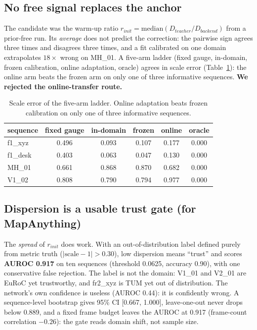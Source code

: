 \subsection{No free signal replaces the anchor}

The candidate was the warm-up ratio
$r_{init}=\mathrm{median}(D_{teacher}/D_{backend})$ from a prior-free run. Its
\emph{average} does not predict the correction: the pairwise sign agrees three
times and disagrees three times, and a fit calibrated on one domain extrapolates
$18\times$ wrong on MH\_01. A five-arm ladder (fixed gauge, in-domain, frozen
calibration, online adaptation, oracle) agrees in scale error
(Table~\ref{tab:ladder}): the online arm beats the frozen arm on only one of
three informative sequences. \textbf{We rejected the online-transfer route.}

\begin{table}[t]
\centering
\caption{Scale error of the five-arm ladder. Online adaptation beats frozen
calibration on only one of three informative sequences.}
\label{tab:ladder}
\small
\begin{tabular}{@{}lccccc@{}}
\toprule
sequence & fixed gauge & in-domain & frozen & online & oracle \\
\midrule
f1\_xyz & 0.496 & 0.093 & 0.107 & 0.177 & 0.000 \\
f1\_desk & 0.403 & 0.063 & 0.047 & 0.130 & 0.000 \\
MH\_01 & 0.661 & 0.868 & 0.870 & 0.682 & 0.000 \\
V1\_02 & 0.808 & 0.790 & 0.794 & 0.977 & 0.000 \\
\bottomrule
\end{tabular}
\end{table}

\subsection{Dispersion is a usable trust gate (for MapAnything)}
\label{sec:gate}

The \emph{spread} of $r_{init}$ does work. With an out-of-distribution label
defined purely from metric truth ($|\mathrm{scale}-1|>0.30$), low dispersion
means ``trust'' and scores \textbf{AUROC 0.917} on ten sequences (threshold
0.0625, accuracy 0.90), with one conservative false rejection. The label is not
the domain: V1\_01 and V2\_01 are EuRoC yet trustworthy, and fr2\_xyz is TUM yet
out of distribution. The network's own confidence is useless (AUROC 0.44): it is
confidently wrong. A sequence-level bootstrap gives 95\% CI [0.667, 1.000],
leave-one-out never drops below 0.889, and a fixed frame budget leaves the AUROC
at 0.917 (frame-count correlation $-0.26$): the gate reads domain shift, not
sample size.

